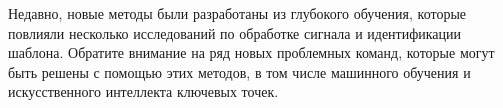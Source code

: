 \begin{frame}

    Недавно, новые методы были разработаны из глубокого обучения,
    которые повлияли несколько исследований по обработке сигнала и идентификации шаблона.
    Обратите внимание на ряд новых проблемных команд, которые могут быть решены с помощью этих методов,
    в том числе машинного обучения и искусственного интеллекта ключевых точек.

\end{frame}